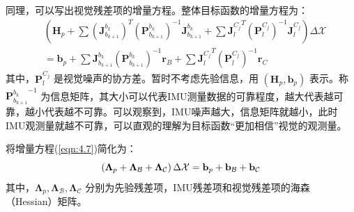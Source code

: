 同理，可以写出视觉残差项的增量方程。整体目标函数的增量方程为：
\begin{equation}
\label{eqn:4.7}
\begin{aligned}
& \left( \mathbf{H}_{p}+\sum (\mathbf{J}_{b_{k+1}}^{b_{k}})^{T} (\mathbf{P}_{b_{k+1}}^{b_{k}})^{-1} \mathbf{J}_{b_{k+1}}^{b_{k}}+\sum {\mathbf{J}_{l}^{C_{j}}}^{T}  (\mathbf{P}_{l}^{C_j})^{-1}  \mathbf{J}_{l}^{C_{j}}\right) \Delta \mathcal{X} \\
& = \mathbf{b}_{p}+\sum \mathbf{J}_{b_{k+1}}^{b_{k}} (\mathbf{P}_{b_{k+1}}^{b_{k}})^{-1} \mathbf{r}_{B}+\sum {\mathbf{J}_{l}^{C_{j}} }^T  (\mathbf{P}_{l}^{C_j})^{-1}  \mathbf{r}_{C}
\end{aligned}
\end{equation}
其中，$\mathbf{P}_{l}^{C_{j}} $ 是视觉噪声的协方差。暂时不考虑先验信息，用 $(\mathbf{H}_p, \mathbf{b}_p) $ 表示。称 ${\mathbf{P}_{b_{k+1}}^{b_{k}}}^{-1} $ 为信息矩阵，其大小可以代表IMU测量数据的可靠程度，越大代表越可靠，越小代表越不可靠。可以观察到，IMU噪声越大，信息矩阵就越小，此时IMU观测量就越不可靠，可以直观的理解为目标函数“更加相信”视觉的观测量。

将增量方程(\ref{eqn:4.7})简化为：
\begin{equation}
\label{eqn:4.8}
\setlength{\abovedisplayskip}{6pt}
\setlength{\belowdisplayskip}{6pt}
\left( \bm{\Lambda}_{p}+\bm{\Lambda}_{\mathcal{B}}+\bm{\Lambda}_{\mathcal{C}} \right) \Delta \mathcal{X}=\mathbf{b}_{p}+\mathbf{b}_{\mathcal{B}}+\mathbf{b}_{\mathcal{C}}
\end{equation}
其中，$\bm{\Lambda}_{p}, \bm{\Lambda}_{\mathcal{B}}, \bm{\Lambda}_{\mathcal{C}} $ 分别为先验残差项，IMU残差项和视觉残差项的海森（Hessian）矩阵。
